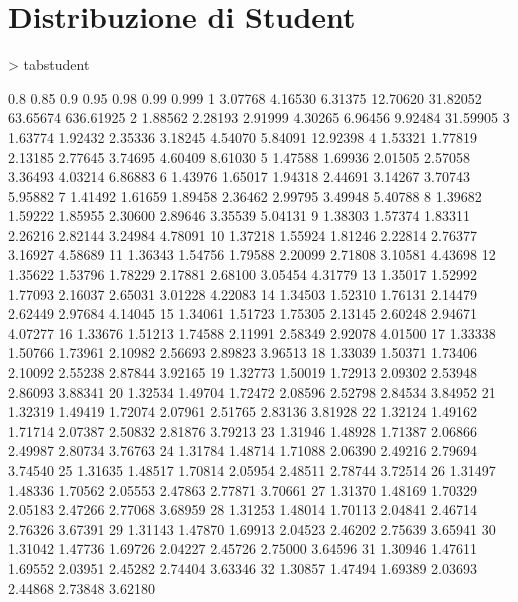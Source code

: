 \documentclass[onecolumn,12pt]{book}
\begin{document}
\section*{Distribuzione di Student}
\oddsidemargin 0.0in
\evensidemargin 0.0in
\topmargin -0.4in
\begin{Schunk}
\begin{Sinput}
>  tabstudent
\end{Sinput}
\begin{Soutput}
        0.8    0.85     0.9     0.95     0.98     0.99     0.999
1   3.07768 4.16530 6.31375 12.70620 31.82052 63.65674 636.61925
2   1.88562 2.28193 2.91999  4.30265  6.96456  9.92484  31.59905
3   1.63774 1.92432 2.35336  3.18245  4.54070  5.84091  12.92398
4   1.53321 1.77819 2.13185  2.77645  3.74695  4.60409   8.61030
5   1.47588 1.69936 2.01505  2.57058  3.36493  4.03214   6.86883
6   1.43976 1.65017 1.94318  2.44691  3.14267  3.70743   5.95882
7   1.41492 1.61659 1.89458  2.36462  2.99795  3.49948   5.40788
8   1.39682 1.59222 1.85955  2.30600  2.89646  3.35539   5.04131
9   1.38303 1.57374 1.83311  2.26216  2.82144  3.24984   4.78091
10  1.37218 1.55924 1.81246  2.22814  2.76377  3.16927   4.58689
11  1.36343 1.54756 1.79588  2.20099  2.71808  3.10581   4.43698
12  1.35622 1.53796 1.78229  2.17881  2.68100  3.05454   4.31779
13  1.35017 1.52992 1.77093  2.16037  2.65031  3.01228   4.22083
14  1.34503 1.52310 1.76131  2.14479  2.62449  2.97684   4.14045
15  1.34061 1.51723 1.75305  2.13145  2.60248  2.94671   4.07277
16  1.33676 1.51213 1.74588  2.11991  2.58349  2.92078   4.01500
17  1.33338 1.50766 1.73961  2.10982  2.56693  2.89823   3.96513
18  1.33039 1.50371 1.73406  2.10092  2.55238  2.87844   3.92165
19  1.32773 1.50019 1.72913  2.09302  2.53948  2.86093   3.88341
20  1.32534 1.49704 1.72472  2.08596  2.52798  2.84534   3.84952
21  1.32319 1.49419 1.72074  2.07961  2.51765  2.83136   3.81928
22  1.32124 1.49162 1.71714  2.07387  2.50832  2.81876   3.79213
23  1.31946 1.48928 1.71387  2.06866  2.49987  2.80734   3.76763
24  1.31784 1.48714 1.71088  2.06390  2.49216  2.79694   3.74540
25  1.31635 1.48517 1.70814  2.05954  2.48511  2.78744   3.72514
26  1.31497 1.48336 1.70562  2.05553  2.47863  2.77871   3.70661
27  1.31370 1.48169 1.70329  2.05183  2.47266  2.77068   3.68959
28  1.31253 1.48014 1.70113  2.04841  2.46714  2.76326   3.67391
29  1.31143 1.47870 1.69913  2.04523  2.46202  2.75639   3.65941
30  1.31042 1.47736 1.69726  2.04227  2.45726  2.75000   3.64596
31  1.30946 1.47611 1.69552  2.03951  2.45282  2.74404   3.63346
32  1.30857 1.47494 1.69389  2.03693  2.44868  2.73848   3.62180

\end{Soutput}
\end{Schunk}
\end{document}
